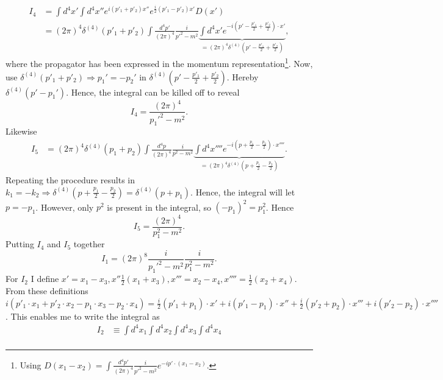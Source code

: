\begin{example}
\begin{enumerate}
		\begin{equation}
			\begin{split}
				I_4&=\int d^4x' \int d^4x''e^{i(p'_1+p'_2)x''}e^{\frac{i}{2}(p'_1-p'_2)x'}D(x')\\
				&=(2\pi)^4\delta^{(4)}(p'_1+p'_2)\int\frac{d^4p'}{(2\pi)^4}\frac{i}{p'^2-m^2}\underbrace{\int d^4x'e^{-i(p'-\frac{p'_1}{2}+\frac{p'_2}{2})\cdot x'}}_{=(2\pi)^4\delta^{(4)}(p'-\frac{p'_1}{2}+\frac{p'_2}{2})},
			\end{split}
		\end{equation} 
		where the propagator has been expressed in the momentum representation\footnote{Using $D(x_1-x_2)=\int\frac{d^4p'}{(2\pi)^4}\frac{i}{p'^2-m^2}e^{-ip'\cdot(x_1-x_2)}$.}. Now, use $\delta^{(4)}(p'_1+p'_2)\Rightarrow p_1'=-p_2'$ in $\delta^{(4)}(p'-\frac{p'_1}{2}+\frac{p'_2}{2})$. Hereby $\delta^{(4)}(p'-p_1')$. Hence, the integral can be killed off to reveal
		\begin{equation}
			I_4=\frac{(2\pi)^4}{p_1'^2-m^2}.
		\end{equation} 
		Likewise
		\begin{equation}
			\begin{split}
				I_5&=(2\pi)^4\delta^{(4)}(p_1+p_2)\int\frac{d^4p}{(2\pi)^4}\frac{i}{p^2-m^2}\underbrace{\int d^4x''''e^{-i(p+\frac{p_1}{2}-\frac{p_2}{2})\cdot x''''}}_{=(2\pi)^4\delta^{(4)}(p+\frac{p_1}{2}-\frac{p_2}{2})}.
			\end{split}
		\end{equation} 
		Repeating the procedure results in $k_1=-k_2\Rightarrow \delta^{(4)}(p+\frac{p_1}{2}-\frac{p_2}{2})=\delta^{(4)}(p+p_1)$. Hence, the integral will let $p=-p_1$. However, only $p^2$ is present in the integral, so $(-p_1)^2=p_1^2$. Hence
		\begin{equation}
			I_5=\frac{(2\pi)^4}{p_1^2-m^2}.
		\end{equation} 
		Putting $I_4$ and $I_5$ together
		\begin{equation}
			I_1=(2\pi)^8\frac{i}{p_1'^2-m^2}\frac{i}{p_1^2-m^2}.
		\end{equation}  
		For $I_2$ I define $x'=x_1-x_3, x''\frac{1}{2}(x_1+x_3), x'''=x_2-x_4, x''''=\frac{1}{2}(x_2+x_4)$. From these definitions $i(p'_1\cdot x_1+p'_2\cdot x_2-p_1\cdot x_3-p_2\cdot x_4)=\frac{i}{2}(p'_1+p_1)\cdot x'+i(p'_1-p_1)\cdot x''+\frac{i}{2}(p'_2+p_2)\cdot x'''+i(p'_2-p_2)\cdot x''''$. This enables me to write the integral as
		\begin{equation}
			\begin{split}
				I_2&\equiv \int d^4x_1\int d^4x_2\int d^4x_3\int d^4x_4 \\

\end{split}
\end{equation}
\end{enumerate}
\end{example}
